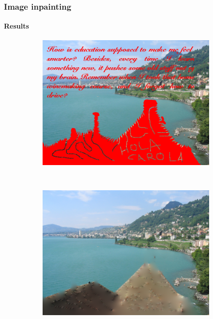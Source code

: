 \documentclass[11pt]{beamer}
\begin{document}
\begin{frame}
\frametitle{Image inpainting}
\framesubtitle{Results}
\begin{figure}
    \centering
    \begin{subfigure}[b]{0.47\textwidth}
        \includegraphics[width=\textwidth]{Image_to_Restore}

    \end{subfigure}
    ~ 
        \begin{subfigure}[b]{0.47\textwidth}
        \includegraphics[width=\textwidth]{Goal_inpaint_bad}

    \end{subfigure}

\end{figure}
\end{frame}
\end{document}
